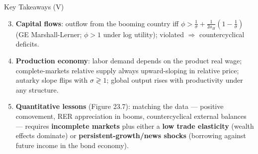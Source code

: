 \documentclass[blue]{beamer}
\begin{document}
\begin{frame}{Key Takeaways (V)}
\begin{enumerate}
    \setcounter{enumi}{2}
    \item \textbf{Capital flows}: outflow from the booming country iff $\phi > \frac{1}{\sigma} + \frac{1}{2a_H}(1 - \frac{1}{\sigma})$ (GE Marshall-Lerner; $\phi > 1$ under log utility); violated $\Rightarrow$ countercyclical deficits.

    \item \textbf{Production economy}: labor demand depends on the product real wage; complete-markets relative supply always upward-sloping in relative price; autarky slope flips with $\sigma \gtrless 1$; global output rises with productivity under any structure.

    \item \textbf{Quantitative lessons} (Figure 23.7): matching the data --- positive comovement, RER appreciation in booms, countercyclical external balances --- requires \textbf{incomplete markets} plus either a \textbf{low trade elasticity} (wealth effects dominate) or \textbf{persistent-growth/news shocks} (borrowing against future income in the bond economy).
\end{enumerate}
\end{frame}
\end{document}
